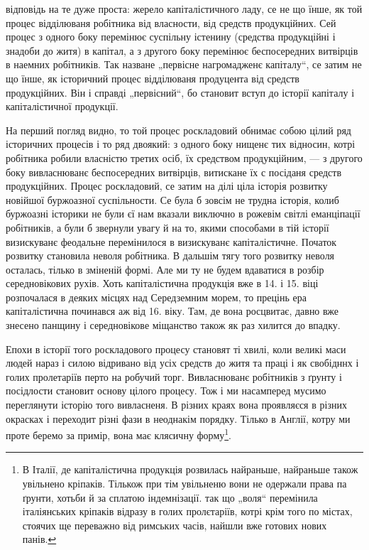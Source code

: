 \parcont{}
відповідь на те дуже проста: жерело капіталістичного ладу,
се не що їнше, як той процес відділюваня робітника
від власности, від средств продукційних.
Сей процес з одного боку перемінює суспільну істенину
(средства продукційні і знадоби до житя) в капітал, а з другого
боку перемінює беспосередних витвірців в наемних
робітників. Так назване „первісне нагромадженє капіталу“,
се затим не що їнше, як історичний процес відділюваня
продуцента від средств продукційних. Він і справді „первісний“,
бо становит вступ до історії капіталу і капіталістичної
продукції.

На перший погляд видно, то той процес роскладовий
обнимає собою цілий ряд історичних процесів і то ряд двоякий:
з одного боку нищенє тих відносин, котрі робітника
робили власністю третих осіб, їх средством продукційним,
— з другого боку вивласнюванє беспосередних витвірців,
витискане їх с посіданя средств продукційних. Процес роскладовий,
се затим на ділі ціла історія розвитку новійшої
буржоазної суспільности. Се була б зовсім не трудна історія,
колиб буржоазні історики не були єї нам вказали виключно
в рожевім світлі еманціпації робітників, а були б звернули
увагу й на то, якими способами в тій історії визискуванє
феодальне перемінилося в визискуванє капіталістичне. Початок
розвитку становила неволя робітника. В дальшім тягу
того розвитку неволя осталась, тілько в зміненій формі.
Але ми ту не будем вдаватися в розбір середновікових рухів.
Хоть капіталістична продукція вже в 14. і 15. віці розпочалася
в деяких місцях над Середземним морем, то прецінь
ера капіталістична починався аж від 16. віку. Там,
де вона росцвитає, давно вже знесено панщину і середновікове
міщанство також як раз хилится до впадку.

Епохи в історії того роскладового процесу становят ті
хвилі, коли великі маси людей нараз і силою відривано від
усіх средств до житя та праці і як свобідннх і голих пролетаріїв
перто на робучий торг. Вивласнюванє робітників
з ґрунту і посідлости становит основу цілого процесу. Тож
і ми насамперед мусимо переглянути історію того вивласненя.
В різних краях вона проявляєся в різних окрасках
і переходит різні фази в неоднакім порядку. Тілько в Англії,
котру ми проте беремо за примір, вона має клясичну форму\footnote{
В Італії, де капіталістична продукція розвилась найраньше, найраньше
також увільнено кріпаків. Тількож при тім увільненю вони не
одержали права па ґрунти, хотьби й за сплатою індемнізації. так що
„воля“ перемінила італіянських кріпаків відразу в голих пролєтаріїв, котрі
крім того по містах, стоячих ще переважно від римських часів, найшли
вже готових нових панів.
}.
